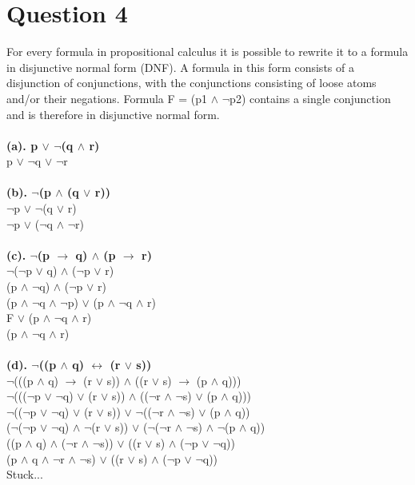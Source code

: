 \documentclass[a4paper]{article}
\begin{document}
\newpage
\section{Question 4}
For every formula in propositional calculus it is possible to rewrite it to a formula in disjunctive normal form (DNF). A formula in this form consists of a disjunction of conjunctions, with the conjunctions consisting of loose atoms and/or their negations. Formula F = (p1 $\wedge $ $\neg $p2) contains a single conjunction and is therefore in disjunctive normal form.
\\\\
\textbf{(a). p $\vee $ $\neg $(q $\wedge $ r)}\\
p $\vee $ $\neg $q $\vee $ $\neg $r
\\\\
\textbf{(b). $\neg $(p $\wedge $ (q $\vee $ r))}\\
$\neg $p $\vee $ $\neg $(q $\vee $ r)\\
$\neg $p $\vee $ ($\neg $q $\wedge $ $\neg $r)
\\\\
\textbf{(c). $\neg $(p $\rightarrow $ q) $\wedge $ (p $\rightarrow $ r)}\\
$\neg $($\neg $p $\vee $ q) $\wedge $ ($\neg $p $\vee $ r)\\
(p $\wedge$ $\neg $q) $\wedge $ ($\neg $p $\vee $ r)\\
(p $\wedge $ $\neg $q $\wedge $ $\neg $p) $\vee $ (p $\wedge $ $\neg $q $\wedge $ r)\\
F $\vee $ (p $\wedge $ $\neg $q $\wedge $ r)\\
(p $\wedge $ $\neg $q $\wedge $ r)
\\\\
\textbf{(d). $\neg $((p $\wedge $ q) $\leftrightarrow $ (r $\vee $ s))}\\
$\neg $(((p $\wedge $ q) $\rightarrow $ (r $\vee $ s)) $\wedge $ ((r $\vee $ s) $\rightarrow $ (p $\wedge $ q)))\\
$\neg $((($\neg $p $\vee $ $\neg $q) $\vee $ (r $\vee $ s)) $\wedge $ (($\neg $r $\wedge $ $\neg $s) $\vee $ (p $\wedge $ q)))\\
$\neg $(($\neg $p $\vee $ $\neg $q) $\vee $ (r $\vee $ s)) $\vee $ $\neg $(($\neg $r $\wedge $ $\neg $s) $\vee $ (p $\wedge $ q))\\
($\neg $($\neg $p $\vee $ $\neg $q) $\wedge $ $\neg $(r $\vee $ s)) $\vee $ ($\neg $($\neg $r $\wedge $ $\neg $s) $\wedge $ $\neg $(p $\wedge $ q))\\
((p $\wedge $ q) $\wedge $ ($\neg $r $\wedge $ $\neg $s)) $\vee $ ((r $\vee $ s) $\wedge $ ($\neg $p $\vee $ $\neg $q))\\
(p $\wedge $ q $\wedge $ $\neg $r $\wedge $ $\neg $s) $\vee $ ((r $\vee $ s) $\wedge $ ($\neg $p $\vee $ $\neg $q))\\
Stuck...
\\\\
\end{document}
